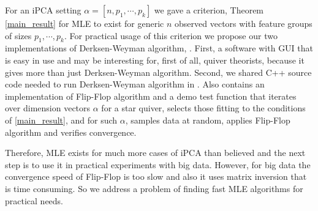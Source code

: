 \documentclass[reqno]{amsart}
\theoremstyle{plain}
\theoremstyle{definition}
\theoremstyle{remark}
\begin{document}
For an iPCA setting $\alpha=[n,p_1,\cdots,p_k]$ we gave a criterion, Theorem \ref{main_result} for MLE to exist for generic $n$ observed vectors with feature groups of sizes $p_1,\cdots,p_k$. For practical usage of this criterion we propose our two implementations of Derksen-Weyman algorithm, \cite{dw}. First, a  software with GUI \cite{t} that is easy in use and may be interesting for, first of all, quiver theorists, because it gives more than just Derksen-Weyman algorithm. Second, we shared C++ source code needed to  run Derksen-Weyman algorithm in \cite{ff}. Also \cite{ff} contains an implementation of Flip-Flop algorithm and a demo test function that iterates over  dimension vectors $\alpha$ for a star quiver, selects those fitting to the conditions of \ref{main_result}, and for such $\alpha$, samples data at random, applies Flip-Flop algorithm and verifies convergence.

Therefore, MLE exists for much more cases of iPCA than \cite{ta} believed and the next step is to use it in practical experiments with big data. However, for big data the convergence speed of Flip-Flop is too slow and also it uses matrix inversion that is time consuming. So we address a problem of finding fast MLE algorithms for practical needs.
\end{document}
